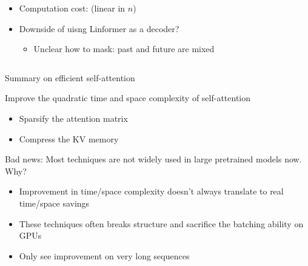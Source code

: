\documentclass[usenames,dvipsnames,notes,11pt,aspectratio=169,hyperref={colorlinks=true, linkcolor=blue}]{beamer}
\newcommand{\pdfnote}[1]{}
\begin{document}
\begin{frame}
\begin{columns}
\begin{column}{0.7\textwidth}
\begin{itemize}[<+->]
\begin{itemize}
                        \item What's the dimension of the attention matrix?
                            \pdfnote{n x k}
                        \item What's the dimension of the self-attention output?
                            \pdfnote{n x d}
                    \end{itemize}
                \item Computation cost:  (linear in $n$)
                \item Downside of uisng Linformer as a decoder?
                    \begin{itemize}
                        \item Unclear how to mask: past and future are mixed
                    \end{itemize}
            \end{itemize}
        \end{column}
    \end{columns}
\end{frame}

\begin{frame}
    {Summary on efficient self-attention}

    Improve the quadratic time and space complexity of self-attention\\
    \begin{itemize}
        \item Sparsify the attention matrix
        \item Compress the KV memory
    \end{itemize}

    \pause
    Bad news: Most techniques are not widely used in large pretrained models now. Why?\\
    \begin{itemize}
        \item Improvement in time/space complexity doesn't always translate to real time/space savings
        \item These techniques often breaks structure and sacrifice the batching ability on GPUs
        \item Only see improvement on very long sequences
    \end{itemize}
\end{frame}
\end{document}
